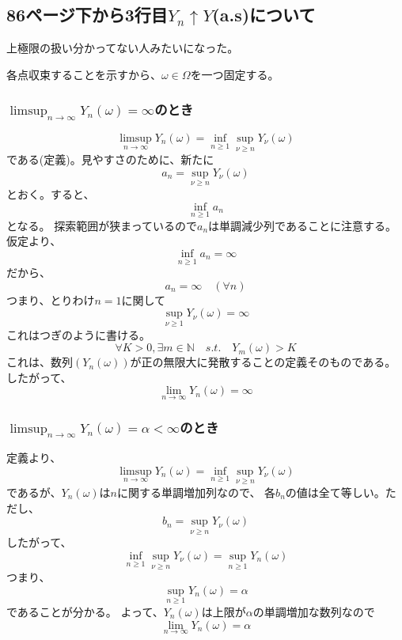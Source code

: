 \documentclass[11pt, a4paper]{jsarticle}
\theoremstyle{definition}
\newcommand{\NN}{{\mathbb{N}}} %
\begin{document}
    \subsection{86ページ下から3行目$Y_n \uparrow Y$(a.s)について}
      上極限の扱い分かってない人みたいになった。

      各点収束することを示すから、$\omega \in \Omega$を一つ固定する。
      \subsubsection{$\limsup_{n \to \infty}{Y_n(\omega)} = \infty$のとき}
        \[
          \limsup_{n \to \infty}{Y_n(\omega)} = \inf_{n \ge 1} \sup_{\nu \ge n} Y_{\nu}(\omega)
        \]
        である(定義)。見やすさのために、新たに
        \[
          a_n = \sup_{\nu \ge n} Y_{\nu}(\omega)
        \]
        とおく。すると、
        \[
          \inf_{n \ge 1} a_n
        \]
        となる。
        探索範囲が狭まっているので$a_n$は単調減少列であることに注意する。
        仮定より、
        \[
          \inf_{n \ge 1} a_n = \infty
        \]
        だから、
        \[
          a_n = \infty \quad (\forall n)
        \]
        つまり、とりわけ$n=1$に関して
        \[
          \sup_{\nu \ge 1} Y_{\nu}(\omega) = \infty
        \]
        これはつぎのように書ける。
        \[
          \forall K >0 , \exists m \in \NN \quad s.t. \quad Y_m(\omega) > K
        \]
        これは、数列$(Y_n(\omega))$が正の無限大に発散することの定義そのものである。
        したがって、
        \[
          \lim_{n \to \infty} Y_n(\omega) = \infty
        \]

      \subsubsection{$\limsup_{n \to \infty}{Y_n(\omega)} = \alpha < \infty$のとき}
        定義より、
        \[
          \limsup_{n \to \infty}{Y_n(\omega)} = \inf_{n \ge 1} \sup_{\nu \ge n} Y_{\nu}(\omega)
        \]
        であるが、$Y_{n}(\omega)$は$n$に関する単調増加列なので、
        各$b_n$の値は全て等しい。ただし、
        \[
          b_n = \sup_{\nu \ge n} Y_{\nu}(\omega)
        \]
        したがって、
        \[
          \inf_{n \ge 1} \sup_{\nu \ge n} Y_{\nu}(\omega) = \sup_{n \ge 1}Y_n(\omega)
        \]
        つまり、
        \[
          \sup_{n \ge 1}Y_n(\omega) = \alpha
        \]
        であることが分かる。
        よって、$Y_n(\omega)$は上限が$\alpha$の単調増加な数列なので
        \[
          \lim_{n \to \infty}Y_n(\omega) = \alpha
        \]
\end{document}
